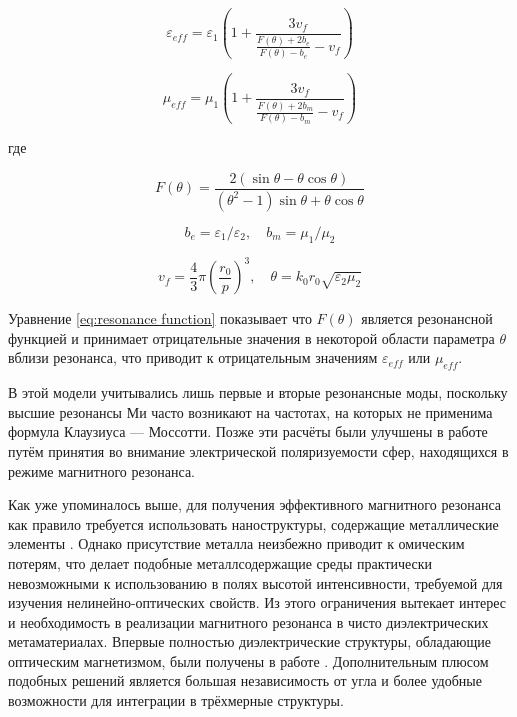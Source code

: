 \begin{equation}
	\varepsilon_{eff} = \varepsilon_1 \left(1 + \frac{3 v_f}{ \frac{F(\theta) + 2b_e}{F(\theta) - b_e} - v_f } \right)
\end{equation}

\begin{equation}
	\mu_{eff} = \mu_1 \left(1 + \frac{3 v_f}{ \frac{F(\theta) + 2b_m}{F(\theta) - b_m} - v_f } \right)
\end{equation}

где

\begin{equation}
	F(\theta) = \frac{2 \left( \sin \theta - \theta \cos \theta\right)}{\left( \theta^2 - 1 \right) \sin \theta + \theta \cos \theta}
	\label{eq:resonance function}
\end{equation}

\begin{equation}
	b_e = \varepsilon_1 / \varepsilon_2, \quad b_m = \mu_1 / \mu_2
\end{equation}

\begin{equation}
	v_f = \frac{4}{3} \pi \left( \frac{r_0}{p} \right)^3, \quad \theta = k_0 r_0 \sqrt{\varepsilon_2 \mu_2}
\end{equation}

Уравнение \ref{eq:resonance function} показывает что $F(\theta)$ является резонансной функцией и принимает отрицательные значения в некоторой области параметра $\theta$ вблизи резонанса, что приводит к отрицательным значениям $\varepsilon_{eff}$ или $\mu_{eff}$.

В этой модели учитывались лишь первые и вторые резонансные моды, поскольку высшие резонансы Ми часто возникают на частотах, на которых не применима формула Клаузиуса — Моссотти. Позже эти расчёты были улучшены в работе \cite{Jylha2006} путём принятия во внимание электрической поляризуемости сфер, находящихся в режиме магнитного резонанса.

Как уже упоминалось выше, для получения эффективного магнитного резонанса как правило требуется использовать наноструктуры, содержащие металлические элементы \cite{Zhao2009}. Однако присутствие металла неизбежно приводит к омическим потерям, что делает подобные металлсодержащие среды практически невозможными к использованию в полях высотой интенсивности, требуемой для изучения нелинейно-оптических свойств. Из этого ограничения вытекает интерес и необходимость в реализации магнитного резонанса в чисто диэлектрических метаматериалах. Впервые полностью диэлектрические структуры, обладающие оптическим магнетизмом, были получены в работе \cite{Ginn2012}. Дополнительным плюсом подобных решений является большая независимость от угла и более удобные возможности для интеграции в трёхмерные структуры.